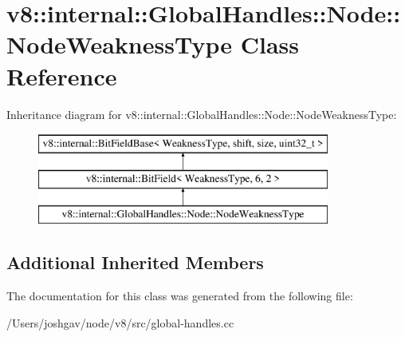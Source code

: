 \hypertarget{classv8_1_1internal_1_1_global_handles_1_1_node_1_1_node_weakness_type}{}\section{v8\+:\+:internal\+:\+:Global\+Handles\+:\+:Node\+:\+:Node\+Weakness\+Type Class Reference}
\label{classv8_1_1internal_1_1_global_handles_1_1_node_1_1_node_weakness_type}
Inheritance diagram for v8\+:\+:internal\+:\+:Global\+Handles\+:\+:Node\+:\+:Node\+Weakness\+Type\+:\begin{figure}[H]
\begin{center}
\leavevmode
\includegraphics[height=3.000000cm]{classv8_1_1internal_1_1_global_handles_1_1_node_1_1_node_weakness_type}
\end{center}
\end{figure}
\subsection*{Additional Inherited Members}


The documentation for this class was generated from the following file\+:\begin{DoxyCompactItemize}
\item 
/\+Users/joshgav/node/v8/src/global-\/handles.\+cc\end{DoxyCompactItemize}
